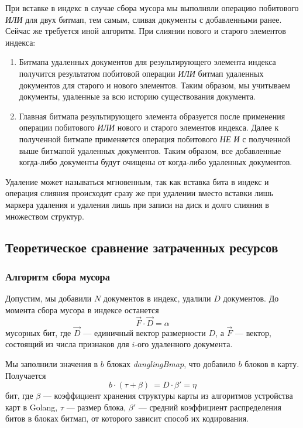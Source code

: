 При вставке в индекс в случае сбора мусора мы выполняли операцию побитового
\textit{ИЛИ} для двух битмап, тем самым, сливая документы с добавленными ранее.
Сейчас же требуется иной алгоритм. При слиянии нового и старого элементов
индекса:
\begin{enumerate}
    \item Битмапа удаленных документов для результирующего элемента индекса
    получится результатом побитовой операции \textit{ИЛИ} битмап удаленных
    документов для старого и нового элементов. Таким образом, мы учитываем
    документы, удаленные за всю историю существования документа.
    \item Главная битмапа результирующего элемента образуется после применения
    операции побитового \textit{ИЛИ} нового и старого элементов индекса. Далее к 
    полученной битмапе применяется операция побитового \textit{НЕ И} с полученной
    выше битмапой удаленных документов. Таким образом, все добавленные когда-либо
    документы будут очищены от когда-либо удаленных документов. 
\end{enumerate}

Удаление может называться мгновенным, так как вставка бита в индекс и операция
слияния происходит сразу же при удалении вместо вставки лишь маркера удаления и
удаления лишь при записи на диск и долго слияния в множеством структур.

\subsection{Теоретическое сравнение затраченных ресурсов}

\subsubsection{Алгоритм сбора мусора}

Допустим, мы добавили $N$ документов в индекс, удалили $D$ документов.
До момента сбора мусора в индексе останется
\begin{equation}
    \label{alpha}
    \vec{F} \cdot \vec{D} = \alpha
\end{equation}
мусорных бит, где $\vec{D}$ — единичный вектор размерности $D$, 
а $\vec{F}$ — вектор, состоящий из числа признаков для $i$-ого удаленного документа.

Мы заполнили значения в $b$ блоках \textit{danglingBmap}, что добавило $b$ блоков в карту.
Получается 
\begin{equation}
    \label{eta}
    b \cdot (\tau + \beta) ~= D \cdot \beta' = \eta
\end{equation}
бит, где $\beta$ — коэффициент хранения структуры карты из алгоритмов устройства
карт в Golang, $\tau$ — размер блока, $\beta'$ —  средний коэффициент
распределения битов в блоках битмап, от которого зависит способ их кодирования.

